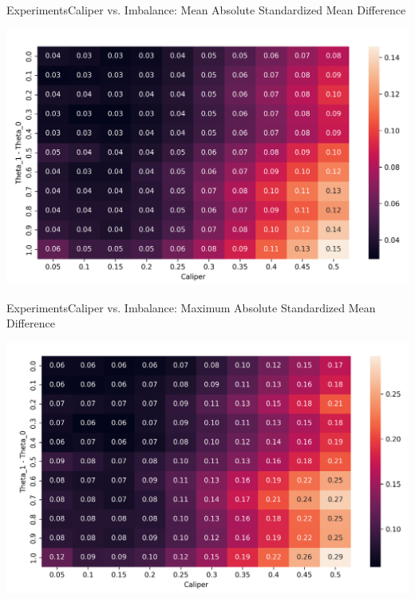 \documentclass[11pt, compress]{beamer}
\begin{document}
\begin{frame}{Experiments}{Caliper vs. Imbalance: Mean Absolute Standardized Mean Difference}
	\begin{center}
		\includegraphics[width=\textwidth]{../paper/img/output30/caliper_vs_imbalance_big/plots/theta1_caliper_mean_abs_smd.png}
	\end{center}
\end{frame}
\begin{frame}{Experiments}{Caliper vs. Imbalance: Maximum Absolute Standardized Mean Difference}
	\begin{center}
		\includegraphics[width=\textwidth]{../paper/img/output30/caliper_vs_imbalance_big/plots/theta1_calipermax_abs_smd.png}
	\end{center}
\end{frame}
\end{document}
